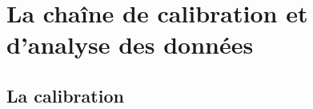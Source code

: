 
%
%
\section{La chaîne de calibration et d'analyse des données}
\label{se:pipeline}

\subsection{La calibration}
\label{se:overview_calibration}

